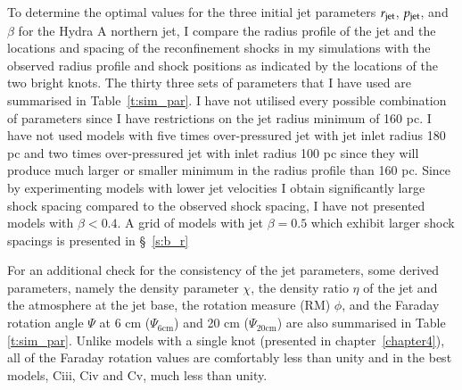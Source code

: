 %
%

To determine the optimal values for the three initial jet parameters $r_{\rm{jet}}$, $p_{\rm{jet}}$, and $\beta$ for the Hydra A northern jet, I compare the radius profile of the jet and the locations and spacing of the reconfinement shocks in my  simulations with the observed radius profile and shock positions as indicated by the locations of the two bright knots. The thirty three sets of parameters that I have used are summarised in Table~\ref{t:sim_par}. I have not utilised every possible combination of parameters since I have restrictions on the jet radius minimum of 160 pc. I have not used models with five times over-pressured jet with jet inlet radius 180 pc and two times over-pressured jet with inlet radius 100 pc since they will produce much larger or smaller minimum in the radius profile than 160 pc. Since by experimenting models with lower jet velocities I obtain significantly large shock spacing compared to the observed shock spacing, I have not presented models with $\beta < 0.4$. A grid of models with jet $\beta = 0.5$ which exhibit larger shock spacings is presented in \S~\ref{s:b_r} 

For an additional check for the consistency of the jet parameters, some derived parameters, namely the density parameter $\chi$, the density ratio $\eta$ of the jet and the atmosphere at the jet base, the rotation measure (RM) $\phi$, and the Faraday rotation angle $\Psi$ at 6 cm ($\Psi_\mathrm{6cm}$) and 20 cm ($\Psi_\mathrm{20cm}$) are also summarised in Table \ref{t:sim_par}. Unlike models with a single knot (presented in chapter~\ref{chapter4}), all of the Faraday rotation values are comfortably less than unity and in the best models, Ciii, Civ and Cv, much less than unity.

